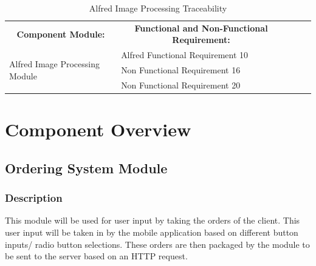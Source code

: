\documentclass [10pt]{article}
\begin{document}
\begin{table}[h!]
\centering
\begin{tabular}{lllll}
\cline{1-2}
\multicolumn{1}{|c|}{\textbf{Component Module:}} & \multicolumn{1}{c|}{\textbf{Functional and Non-Functional Requirement:}} &  &  &  \\ \cline{1-2}
\multicolumn{1}{|l|}{\multirow{3}{*}{Alfred Image Processing Module}} & \multicolumn{1}{l|}{Alfred Functional Requirement 10} &  &  &  \\ \cline{2-2}
\multicolumn{1}{|l|}{} & \multicolumn{1}{l|}{Non Functional Requirement 16} &  &  &  \\ \cline{2-2}
\multicolumn{1}{|l|}{} & \multicolumn{1}{l|}{Non Functional Requirement 20} &  &  &  \\ \cline{1-2}
\end{tabular}
\caption{Alfred Image Processing Traceability}
\end{table}




\pagebreak
\newpage
\section{Component Overview}

\subsection{Ordering System Module}


\subsubsection{Description}
This module will be used for user input by taking the orders of the client. This user input will be taken in by the mobile application based on different button inputs/ radio button selections. These orders are then packaged by the module to be sent to the server based on an HTTP request.

\end{document}
